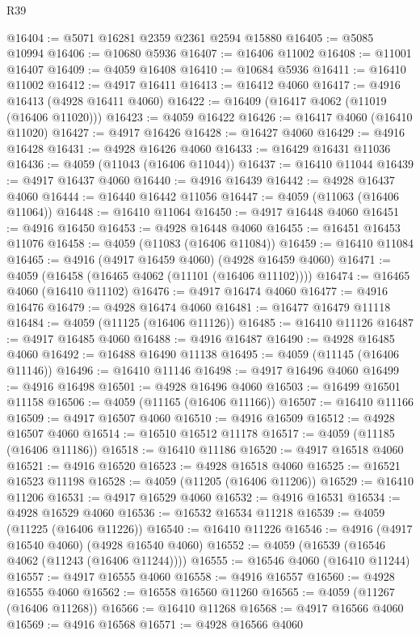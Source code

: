 \begin{lexlean}{R39}
\begin{coremodule}
@16404 := @5071 @16281 @2359 @2361 @2594 @15880
@16405 := @5085 @10994
@16406 := @10680 @5936
@16407 := @16406 @11002
@16408 := @11001 @16407
@16409 := @4059 @16408
@16410 := @10684 @5936
@16411 := @16410 @11002
@16412 := @4917 @16411
@16413 := @16412 @4060
@16417 := @4916 @16413 (@4928 @16411 @4060)
@16422 := @16409 (@16417 @4062 (@11019 (@16406 @11020)))
@16423 := @4059 @16422
@16426 := @16417 @4060 (@16410 @11020)
@16427 := @4917 @16426
@16428 := @16427 @4060
@16429 := @4916 @16428
@16431 := @4928 @16426 @4060
@16433 := @16429 @16431 @11036
@16436 := @4059 (@11043 (@16406 @11044))
@16437 := @16410 @11044
@16439 := @4917 @16437 @4060
@16440 := @4916 @16439
@16442 := @4928 @16437 @4060
@16444 := @16440 @16442 @11056
@16447 := @4059 (@11063 (@16406 @11064))
@16448 := @16410 @11064
@16450 := @4917 @16448 @4060
@16451 := @4916 @16450
@16453 := @4928 @16448 @4060
@16455 := @16451 @16453 @11076
@16458 := @4059 (@11083 (@16406 @11084))
@16459 := @16410 @11084
@16465 := @4916 (@4917 @16459 @4060) (@4928 @16459 @4060)
@16471 := @4059 (@16458 (@16465 @4062 (@11101 (@16406 @11102))))
@16474 := @16465 @4060 (@16410 @11102)
@16476 := @4917 @16474 @4060
@16477 := @4916 @16476
@16479 := @4928 @16474 @4060
@16481 := @16477 @16479 @11118
@16484 := @4059 (@11125 (@16406 @11126))
@16485 := @16410 @11126
@16487 := @4917 @16485 @4060
@16488 := @4916 @16487
@16490 := @4928 @16485 @4060
@16492 := @16488 @16490 @11138
@16495 := @4059 (@11145 (@16406 @11146))
@16496 := @16410 @11146
@16498 := @4917 @16496 @4060
@16499 := @4916 @16498
@16501 := @4928 @16496 @4060
@16503 := @16499 @16501 @11158
@16506 := @4059 (@11165 (@16406 @11166))
@16507 := @16410 @11166
@16509 := @4917 @16507 @4060
@16510 := @4916 @16509
@16512 := @4928 @16507 @4060
@16514 := @16510 @16512 @11178
@16517 := @4059 (@11185 (@16406 @11186))
@16518 := @16410 @11186
@16520 := @4917 @16518 @4060
@16521 := @4916 @16520
@16523 := @4928 @16518 @4060
@16525 := @16521 @16523 @11198
@16528 := @4059 (@11205 (@16406 @11206))
@16529 := @16410 @11206
@16531 := @4917 @16529 @4060
@16532 := @4916 @16531
@16534 := @4928 @16529 @4060
@16536 := @16532 @16534 @11218
@16539 := @4059 (@11225 (@16406 @11226))
@16540 := @16410 @11226
@16546 := @4916 (@4917 @16540 @4060) (@4928 @16540 @4060)
@16552 := @4059 (@16539 (@16546 @4062 (@11243 (@16406 @11244))))
@16555 := @16546 @4060 (@16410 @11244)
@16557 := @4917 @16555 @4060
@16558 := @4916 @16557
@16560 := @4928 @16555 @4060
@16562 := @16558 @16560 @11260
@16565 := @4059 (@11267 (@16406 @11268))
@16566 := @16410 @11268
@16568 := @4917 @16566 @4060
@16569 := @4916 @16568
@16571 := @4928 @16566 @4060

\end{coremodule}
\end{lexlean}
